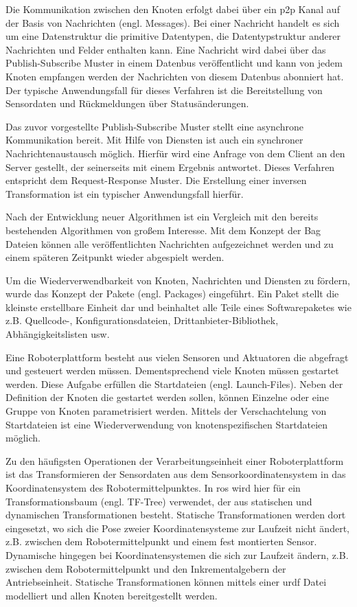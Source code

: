 Die Kommunikation zwischen den Knoten erfolgt dabei über ein \Gls{p2p} Kanal auf der Basis von Nachrichten (engl. Messages). Bei einer Nachricht handelt es sich um eine Datenstruktur die primitive Datentypen, die Datentypstruktur anderer Nachrichten und Felder enthalten kann. Eine Nachricht wird dabei über das Publish-Subscribe Muster in einem Datenbus veröffentlicht und kann von jedem Knoten empfangen werden der Nachrichten von diesem Datenbus abonniert hat. Der typische Anwendungsfall für dieses Verfahren ist die Bereitstellung von Sensordaten und Rückmeldungen über Statusänderungen.

Das zuvor vorgestellte Publish-Subscribe Muster stellt eine asynchrone Kommunikation bereit. Mit Hilfe von Diensten ist auch ein synchroner Nachrichtenaustausch möglich. Hierfür wird eine Anfrage von dem Client an den Server gestellt, der seinerseits mit einem Ergebnis antwortet. Dieses Verfahren entspricht dem Request-Response Muster. Die Erstellung einer inversen Transformation ist ein typischer Anwendungsfall hierfür.

Nach der Entwicklung neuer Algorithmen ist ein Vergleich mit den bereits bestehenden Algorithmen von großem Interesse. Mit dem Konzept der Bag Dateien können alle veröffentlichten Nachrichten aufgezeichnet werden und zu einem späteren Zeitpunkt wieder abgespielt werden.

Um die Wiederverwendbarkeit von Knoten, Nachrichten und Diensten zu fördern, wurde das Konzept der Pakete (engl. Packages) eingeführt. Ein Paket stellt die kleinste erstellbare Einheit dar und beinhaltet alle Teile eines Softwarepaketes wie z.B. Quellcode-, Konfigurationsdateien, Drittanbieter-Bibliothek, Abhängigkeitslisten usw.

Eine Roboterplattform besteht aus vielen Sensoren und Aktuatoren die abgefragt und gesteuert werden müssen. Dementsprechend viele Knoten müssen gestartet werden. Diese Aufgabe erfüllen die Startdateien (engl. Launch-Files). Neben der Definition der Knoten die gestartet werden sollen, können Einzelne oder eine Gruppe von Knoten parametrisiert werden. Mittels der Verschachtelung von Startdateien ist eine Wiederverwendung von knotenspezifischen Startdateien möglich.

Zu den häufigsten Operationen der Verarbeitungseinheit einer Roboterplattform ist das Transformieren der Sensordaten aus dem Sensorkoordinatensystem in das Koordinatensystem des Robotermittelpunktes. In \Gls{ros} wird hier für ein Transformationsbaum (engl. TF-Tree) verwendet, der aus statischen und dynamischen Transformationen besteht. Statische Transformationen werden dort eingesetzt, wo sich die Pose zweier Koordinatensysteme zur Laufzeit nicht ändert, z.B. zwischen dem Robotermittelpunkt und einem fest montierten Sensor. Dynamische hingegen bei Koordinatensystemen die sich zur Laufzeit ändern, z.B. zwischen dem Robotermittelpunkt und den Inkrementalgebern der Antriebseinheit. Statische Transformationen können mittels einer \Gls{urdf} Datei modelliert und allen Knoten bereitgestellt werden.

